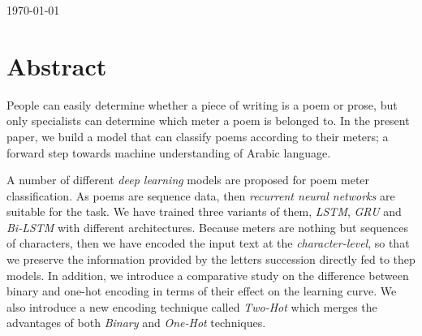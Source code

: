 \documentclass[12pt]{report}
\begin{document}
\begin{titlepage}


{\large \today}\\[2cm] %


\vfill %

\end{titlepage}









\tableofcontents
\newpage

\section*{Abstract}

People can easily determine whether a piece of writing is
a poem or prose, but only specialists can determine which 
meter a poem is belonged to. 
In the present paper, we build a model that can classify poems
according to their meters; a forward step towards machine understanding of Arabic language.

A number of different \textit{deep learning} models are proposed for poem meter
classification. As poems are sequence data, then \textit{recurrent neural
networks} are suitable for the task.  We have trained three variants of them,
\textit{LSTM}, \textit{GRU} and \textit{Bi-LSTM} with different architectures.
Because meters are nothing but sequences of characters,
then we have encoded the input text at the \textit{character-level},
so that we preserve the information provided by the letters succession directly fed to thep models. In addition,
we introduce a comparative study on the difference between binary and one-hot encoding
in terms of their effect on the learning curve. 
We also introduce a new encoding technique called \textit{Two-Hot} which 
merges the advantages of both \textit{Binary} and \textit{One-Hot} techniques.
\end{document}
